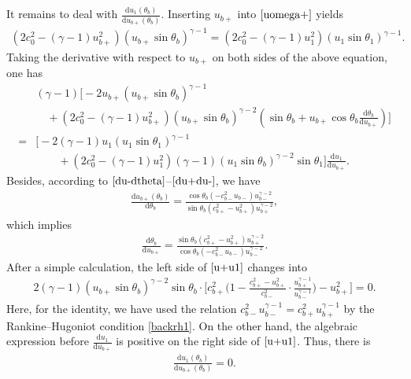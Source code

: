 \documentclass[reqno,12pt]{amsart}
\newcommand{\dd}{\mathrm{d}}
\numberwithin{equation}{section}
\begin{document}
It remains to deal with $\frac{\dd u_1(\theta_b)}{\dd u_{b+}(\theta_b)}$. Inserting $u_{b+}$ into $\eqref{uomega+}$ yields
	\begin{align*}
		(2c^2_0-(\gamma-1)u^2_{b+})(u_{b+}\sin\theta_b)^{\gamma-1}=(2c^2_0-(\gamma-1)u^2_1)(u_1\sin\theta_1)^{\gamma-1}.
	\end{align*}
Taking the derivative with respect to $u_{b+}$ on both sides of the above equation, one has
	\begin{align}
		&(\gamma-1)\Big[-2u_{b+}(u_{b+}\sin\theta_b)^{\gamma-1}\nonumber\\
		&\quad+(2c_0^2-(\gamma-1)u_{b+}^2)(u_{b+}\sin\theta_b)^{\gamma-2}
	(\sin\theta_b+u_{b+}\cos\theta_b\frac{\dd \theta_b}{\dd u_{b+}})\Big]\nonumber\\
		=&\Big[-2(\gamma-1)u_1(u_1\sin\theta_1)^{\gamma-1}\nonumber\\
		&\qquad+(2c_0^2-(\gamma-1)u_1^2)(\gamma-1)(u_1\sin\theta_b)^{\gamma-2}\sin\theta_1 \Big]\frac{\dd u_1}{\dd u_{b+}}.\label{u+u1}
	\end{align}
Besides, according to $\eqref{du-dtheta}$--$\eqref{du+du-}$, we have
	\begin{align*}
		\frac{\dd u_{b+}(\theta_b)}{\dd \theta_b}=\frac{\cos\theta_b(-c^2_{b-}u_{b-})u^{\gamma-2}_{b-}}{\sin\theta_b(c^2_{b+}-u^2_{b+})u^{\gamma-2}_{b+}},
	\end{align*}
which implies
	\begin{align*}
		\frac{\dd \theta_b}{\dd u_{b+}}=\frac{\sin\theta_b(c^2_{b+}-u^2_{b+})u^{\gamma-2}_{b+}}{\cos\theta_b(-c^2_{b-}u_{b-})u^{\gamma-2}_{b-}}.
	\end{align*}	
After a simple calculation, the left side of $\eqref{u+u1}$ changes into 
		\begin{align}\label{*}
		2(\gamma-1)(u_{b+}\sin\theta_b)^{\gamma-2}\sin\theta_b\cdot\Big[c^2_{b+}\big(1-\frac{c^2_{b+}-u^2_{b+}}{c^2_{b-}}\cdot\frac{u^{\gamma-1}_{b+}}{u^{\gamma-1}_{b-}}\big)-u^2_{b+}\Big]=0.
	\end{align}
Here, for the identity, we have used the relation $c_{b-}^2u_{b-}^{\gamma-1}=c_{b+}^2u_{b+}^{\gamma-1}$ by the Rankine–Hugoniot condition \eqref{backrh1}. On the other hand, the algebraic expression before $\frac{\dd u_1}{\dd u_{b+}}$ is positive on the right side of $\eqref{u+u1}$. Thus, there is
	\begin{align}\label{du1dub+}
	\frac{\dd u_1(\theta_b)}{\dd u_{b+}(\theta_b) }=0.
	\end{align}
\end{document}
